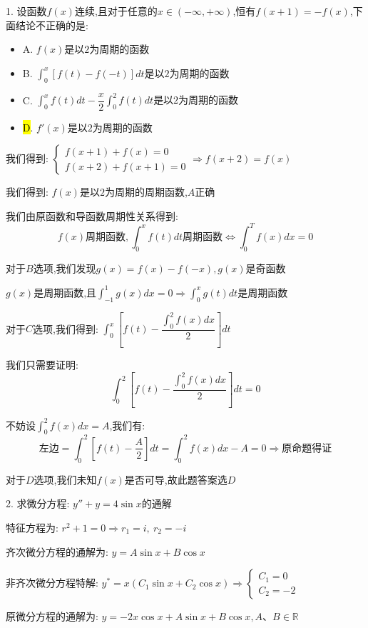 1. 设函数$f(x)$连续,且对于任意的$x\in(-\infty,+\infty)$,恒有$f(x+1)=-f(x)$,下面结论不正确的是: 
\begin{itemize}
	\item A. $f(x)\text{是以2为周期的函数}$ 
	\item B. $\int_{0}^{x}[f(t)-f(-t)]dt\text{是以2为周期的函数}$ 
	\item C. $\int_{0}^{x}f(t)dt-\dfrac{x}{2}\int_{0}^{2}f(t)dt\text{是以2为周期的函数}$ 
	\item \hl{D}. $f'(x)\text{是以2为周期的函数}$ 
\end{itemize}
\begin{solution}
	
	我们得到: $\left\lbrace 
	\begin{array}{l}
		f(x+1)+f(x)=0\\
		f(x+2)+f(x+1)=0
	\end{array}
	\right. \Rightarrow f(x+2)=f(x)$
	
	我们得到: $f(x)$是以$2$为周期的周期函数,$A$正确
	
	我们由原函数和导函数周期性关系得到: 
	$$f(x)\text{周期函数},\int_{0}^{x}f(t)dt\text{周期函数}\Leftrightarrow \int_{0}^{T}f(x)dx=0$$
	
	对于$B$选项,我们发现$g(x)=f(x)-f(-x),g(x)\text{是奇函数}$
	
	$g(x)\text{是周期函数}$,且$\int_{-1}^{1}g(x)dx=0\Rightarrow \int_{0}^{x}g(t)dt\text{是周期函数}$
	
	对于$C$选项,我们得到: $\int_{0}^{x}[f(t)-\dfrac{\int_{0}^{2}f(x)dx}{2}]dt$
	
	我们只需要证明: 
	$$\int_{0}^{2}[f(t)-\frac{\int_{0}^{2}f(x)dx}{2}]dt=0$$
	
	不妨设$\int_{0}^{2}f(x)dx=A$,我们有: 
	$$\text{左边}=\int_{0}^{2}[f(t)-\frac{A}{2}]dt=\int_{0}^{2}f(x)dx-A=0\Rightarrow \text{原命题得证}$$
	
	对于$D$选项,我们未知$f(x)$是否可导,故此题答案选$D$
\end{solution}

2. 求微分方程: $y''+y=4\sin x$的通解
\begin{solution}
	
	特征方程为: $r^2+1=0\Rightarrow r_{1}=i,\ r_{2}=-i$
	
	齐次微分方程的通解为: $y=A\sin x+B\cos x$
	
	非齐次微分方程特解: $y^{*}=x(C_{1}\sin x+C_{2}\cos x)\Rightarrow \left\lbrace 
	\begin{array}{l}
		C_{1}=0\\
		C_{2}=-2
	\end{array}
	\right. $
	
	原微分方程的通解为: $y=-2x\cos x+A\sin x+B\cos x,A\text{、}B\in \mathbb{R}$
\end{solution}

